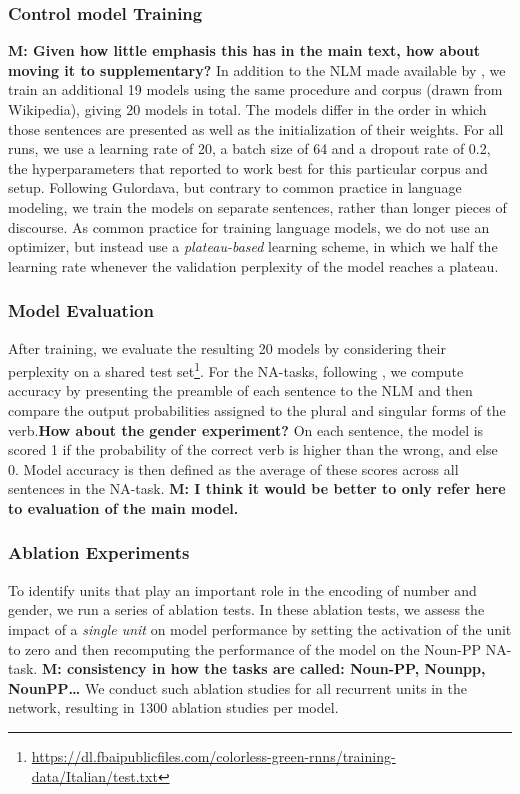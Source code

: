 \subsubsection{Control model Training} 
\textbf{M: Given how little emphasis this has in the main text, how about moving it to supplementary?} In addition to the NLM made available by \citet{Gulordava:etal:2018}, we train an additional 19 models using the same procedure and corpus (drawn from Wikipedia), giving 20 models in total. 
The models differ in the order in which those sentences are presented as well as the initialization of their weights.
For all runs, we use a learning rate of 20, a batch size of 64 and a dropout rate of 0.2, the hyperparameters that \citet{Gulordava:etal:2018} reported to work best for this particular corpus and setup.
Following Gulordava, but contrary to common practice in language modeling, we train the models on separate sentences, rather than longer pieces of discourse.
As common practice for training language models, we do not use an optimizer, but instead use a \emph{plateau-based} learning scheme, in which we half the learning rate whenever the validation perplexity of the model reaches a plateau.

\subsubsection{Model Evaluation} After training, we evaluate the resulting 20 models by considering their perplexity on a shared test set\footnote{\url{https://dl.fbaipublicfiles.com/colorless-green-rnns/training-data/Italian/test.txt}}. For the NA-tasks, following \citet{Linzen:etal:2016}, we compute accuracy by presenting the preamble of each sentence to the NLM and then compare the output probabilities assigned to the plural and singular forms of the verb.\textbf{How about the gender experiment?} On each sentence, the model is scored 1 if the probability of the correct verb is higher than the wrong, and else 0. Model accuracy is then defined as the average of these scores across all sentences in the NA-task. \textbf{M: I think it would be better to only refer here to evaluation of the main model.}

\subsubsection{Ablation Experiments}
To identify units that play an important role in the encoding of number and gender, we run a series of ablation tests.
In these ablation tests, we assess the impact of a \emph{single unit} on model performance by setting the activation of the unit to zero and then recomputing the performance of the model on the Noun-PP NA-task. \textbf{M: consistency in how the tasks are called: Noun-PP, Nounpp, NounPP\ldots} 
We conduct such ablation studies for all recurrent units in the network, resulting in 1300 ablation studies per model.


